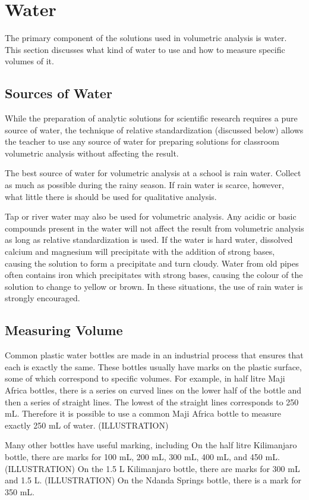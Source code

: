 \section{Water}
The primary component of the solutions used in volumetric analysis is water. This section discusses what kind of water to use and how to measure specific volumes of it.

\subsection{Sources of Water}
While the preparation of analytic solutions for scientific research requires a pure source of water, the technique of relative standardization (discussed below) allows the teacher to use any source of water for preparing solutions for classroom volumetric analysis without affecting the result.

The best source of water for volumetric analysis at a school is rain water. Collect as much as possible during the rainy season. If rain water is scarce, however, what little there is should be used for qualitative analysis.

Tap or river water may also be used for volumetric analysis. Any acidic or basic compounds present in the water will not affect the result from volumetric analysis as long as relative standardization is used. If the water is hard water, dissolved calcium and magnesium will precipitate with the addition of strong bases, causing the solution to form a precipitate and turn cloudy. Water from old pipes often contains iron which precipitates with strong bases, causing the colour of the solution to change to yellow or brown. In these situations, the use of rain water is strongly encouraged.

\subsection{Measuring Volume}
Common plastic water bottles are made in an industrial process that ensures that each is exactly the same. These bottles usually have marks on the plastic surface, some of which correspond to specific volumes. For example, in half litre Maji Africa bottles, there is a series on curved lines on the lower half of the bottle and then a series of straight lines. The lowest of the straight lines corresponds to 250 mL. Therefore it is possible to use a common Maji Africa bottle to measure exactly 250 mL of water. (ILLUSTRATION)

Many other bottles have useful marking, including 
On the half litre Kilimanjaro bottle, there are marks for 100 mL, 200 mL, 300 mL, 400 mL, and 450 mL. (ILLUSTRATION)
On the 1.5 L Kilimanjaro bottle, there are marks for 300 mL and 1.5 L. (ILLUSTRATION)
On the Ndanda Springs bottle, there is a mark for 350 mL.

